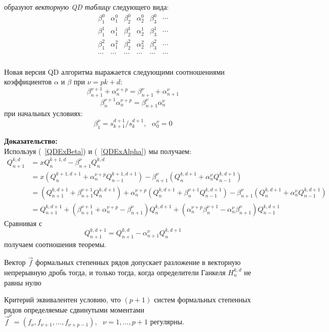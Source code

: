{образуют \emph {векторную QD таблицу}  следующего вида:
\begin{equation}
\begin{array}{ccccccccccccccccc}
\beta_1^0 & \alpha_1^0 & \beta_2^0 & \alpha_2^0 & \beta_3^0 & \cdots \\
\beta_1^1 & \alpha_1^1 & \beta_2^1 & \alpha_2^1 & \beta_3^1 & \cdots \\
\beta_1^2 & \alpha_1^2 & \beta_2^2 & \alpha_2^2 & \beta_3^2 & \cdots \\
\cdots & \cdots & \cdots & \cdots & \cdots & \cdots  \\
\end{array}
\end{equation}

\begin{teor}
Новая версия QD алгоритма выражается следующими соотношениями
коэффициентов $\alpha$ и $\beta$ при $\nu=pk+d$:
\begin{equation}
\label{QDExRec} \beta_{n+1}^{\nu+1}+\alpha_n^{\nu+p} =
\beta_{n+1}^{\nu}+\alpha_{n+1}^{\nu}
\end{equation}
\begin{equation}
\beta_{n}^{\nu+1}\alpha_n^{\nu+p} =
\beta_{n+1}^{\nu}\alpha_{n}^{\nu}
\end{equation}
при начальных условиях:
\begin{equation}
\beta_1^{\nu} = s^{d+1}_{k+1}/s_{k}^{d+1},\mbox{   }
\alpha_0^{\nu}=0
\end{equation}
\end{teor}
\textbf{Доказательство:} \\
Используя (~\ref{QDExBeta}) и (~\ref{QDExAlpha}) мы получаем:
$$%
\begin{array}{lllllllll}
Q_{n+1}^{k,d} & =xQ_n^{k+1,d}-\beta_{n+1}^{{\nu}} Q_n^{k,d} \\
&
=x(Q_n^{k+1,d+1}+\alpha_n^{\nu+p}Q_{n-1}^{k+1,d+1})-\beta_{n+1}^{{\nu}}
(Q_n^{k,d+1}+\alpha_n^{\nu}Q_{n-1}^{k,d+1}) \\
&
=(Q_{n+1}^{k,d+1}+\beta_{n+1}^{\nu+1}Q_n^{k,d+1})+\alpha_n^{\nu+p}(Q_n^{k,d+1}+\beta_n^{\nu+1}Q_{n-1}^{k,d+1})-\beta_{n+1}^{{\nu}}
(Q_n^{k,d+1}+\alpha_n^{\nu}Q_{n-1}^{k,d+1}) \\
& =
Q_{n+1}^{k,d+1}+(\beta_{n+1}^{\nu+1}+\alpha_{n}^{\nu+p}-\beta_{n+1}^{\nu})Q_n^{k,d+1}+(\alpha_n^{\nu+p}\beta_{n}^{\nu+1}-\alpha_n^{\nu}\beta_{n+1}^{\nu})Q_{n-1}^{k,d+1}
\end{array}
$$%
Сравнивая с $$
Q_{n+1}^{k,d+1}=Q_{n+1}^{k,d}-\alpha_{n+1}^{\nu} Q_{n}^{k,d+1}
$$
получаем соотношения теоремы. \\
\begin{teor} Вектор  $\overrightarrow{f}$ формальных степенных рядов
допускает разложение в векторную непрерывную дробь тогда, и только
тогда, когда определители Ганкеля $H_n^{k,d}$ не равны нулю
\end{teor}
Критерий эквивалентен условию, что $(p+1)$ систем формальных
степенных рядов определяемые сдвинутыми моментами
$\overrightarrow{f}^{\nu}=(f_{\nu},f_{\nu+1},...,f_{\nu+p-1}),
\mbox{   } \nu=1,...,p+1$ регулярны.

}
